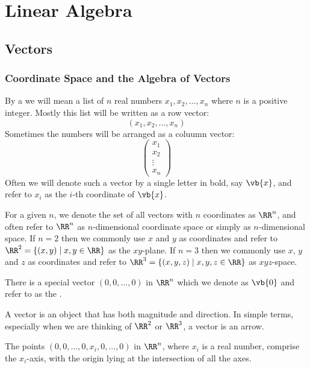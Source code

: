 \part{Linear Algebra}
\chapter{Vectors}
\section{Coordinate Space and the Algebra of Vectors}
\begin{definition}
By a  we will mean a list of $n$ real numbers $x_1,x_2,\dots,x_n$ where $n$ is a positive integer. Mostly this list will be written as a row vector:
\[ (x_1,x_2,\dots,x_n) \]
Sometimes the numbers will be arranged as a coluumn vector:
\[ \begin{pmatrix}
x_1\\x_2\\\vdots\\x_n
\end{pmatrix} \]
Often we will denote such a vector by a single letter in bold, say $\vb{x}$, and refer to $x_i$ as the $i$-th coordinate of $\vb{x}$.
\end{definition}

\begin{definition}
For a given $n$, we denote the set of all vectors with $n$ coordinates as $\RR^n$, and often refer to $\RR^n$ as $n$-dimensional coordinate space or simply as $n$-dimensional space. If $n=2$ then we commonly use $x$ and $y$ as coordinates and refer to $\RR^2=\{(x,y)\mid x,y\in\RR\}$ as the $xy$-plane. If $n=3$ then we commonly use $x$, $y$ and $z$ as coordinates and refer to $\RR^3=\{(x,y,z)\mid x,y,z\in\RR\}$ as $xyz$-space.
\end{definition}

\begin{definition}
There is a special vector $(0,0,\dots,0)$ in $\RR^n$ which we denote as $\vb{0}$ and refer to as the .
\end{definition}

A vector is an object that has both magnitude and direction. In simple terms, especially when we are thinking of $\RR^2$ or $\RR^3$, a vector is an arrow.

\begin{definition}
The points $(0,0,\dots,0,x_i,0,\dots,0)$ in $\RR^n$, where $x_i$ is a real number, comprise the $x_i$-axis, with the origin lying at the intersection of all the axes.
\end{definition}


